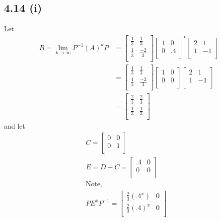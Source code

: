\documentclass[letterpaper,12pt]{article}
\theoremstyle{definition}
\begin{document}
\subsection*{4.14 (i)}
        Let
\begin{align*}
    B = \lim_{k\to \infty}  P^{-1}(A)^kP & = \begin{bmatrix}\frac{1}{3} & \frac{1}{3} \\
                    \frac{1}{3} & \frac{-2}{3} \\
    \end{bmatrix}
    \begin{bmatrix}1 & 0 \\
                    0 & .4 \\
    \end{bmatrix}^k
    \begin{bmatrix}2 & 1 \\
                    1 & -1 \\
    \end{bmatrix}\\
    & = \begin{bmatrix}\frac{1}{3} & \frac{1}{3} \\
                    \frac{1}{3} & \frac{-2}{3} \\
    \end{bmatrix}
    \begin{bmatrix}1 & 0 \\
                    0 & 0 \\
    \end{bmatrix}
    \begin{bmatrix}2 & 1 \\
                    1 & -1 \\
    \end{bmatrix}\\
    & = \begin{bmatrix}\frac{2}{3} & \frac{2}{3} \\
                    \frac{1}{3} & \frac{1}{3} \\
    \end{bmatrix}
\end{align*}
and let
\begin{align*}
    C = \begin{bmatrix}0 & 0 \\
                    0 & 1 \\
    \end{bmatrix}\\
    E = D-C = \begin{bmatrix}.4 & 0 \\
                     0&  0\\
    \end{bmatrix}\\
    \text{Note, }\quad \quad &\\
    PE^xP^{-1} = \begin{bmatrix}\frac{2}{3}(.4^x) & 0 \\
                    \frac{2}{3}(.4)^x & 0 \\
    \end{bmatrix}
\end{align*}
\end{document}
